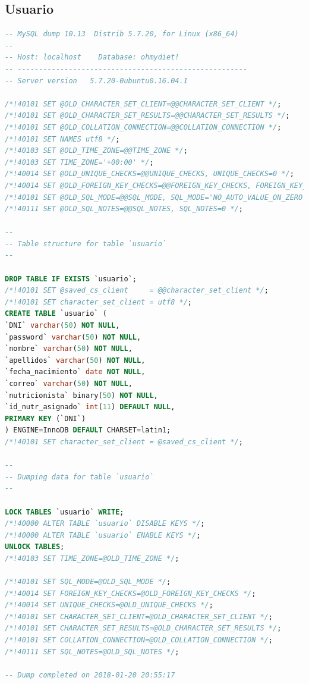 \documentclass[12pt,letterpaper]{article}
\begin{document}
\subsection{Usuario}
\begin{lstlisting}[language=sql]
-- MySQL dump 10.13  Distrib 5.7.20, for Linux (x86_64)
--
-- Host: localhost    Database: ohmydiet!
-- ------------------------------------------------------
-- Server version	5.7.20-0ubuntu0.16.04.1

/*!40101 SET @OLD_CHARACTER_SET_CLIENT=@@CHARACTER_SET_CLIENT */;
/*!40101 SET @OLD_CHARACTER_SET_RESULTS=@@CHARACTER_SET_RESULTS */;
/*!40101 SET @OLD_COLLATION_CONNECTION=@@COLLATION_CONNECTION */;
/*!40101 SET NAMES utf8 */;
/*!40103 SET @OLD_TIME_ZONE=@@TIME_ZONE */;
/*!40103 SET TIME_ZONE='+00:00' */;
/*!40014 SET @OLD_UNIQUE_CHECKS=@@UNIQUE_CHECKS, UNIQUE_CHECKS=0 */;
/*!40014 SET @OLD_FOREIGN_KEY_CHECKS=@@FOREIGN_KEY_CHECKS, FOREIGN_KEY_CHECKS=0 */;
/*!40101 SET @OLD_SQL_MODE=@@SQL_MODE, SQL_MODE='NO_AUTO_VALUE_ON_ZERO' */;
/*!40111 SET @OLD_SQL_NOTES=@@SQL_NOTES, SQL_NOTES=0 */;

--
-- Table structure for table `usuario`
--

DROP TABLE IF EXISTS `usuario`;
/*!40101 SET @saved_cs_client     = @@character_set_client */;
/*!40101 SET character_set_client = utf8 */;
CREATE TABLE `usuario` (
`DNI` varchar(50) NOT NULL,
`password` varchar(50) NOT NULL,
`nombre` varchar(50) NOT NULL,
`apellidos` varchar(50) NOT NULL,
`fecha_nacimiento` date NOT NULL,
`correo` varchar(50) NOT NULL,
`nutricionista` binary(50) NOT NULL,
`id_nutr_asignado` int(11) DEFAULT NULL,
PRIMARY KEY (`DNI`)
) ENGINE=InnoDB DEFAULT CHARSET=latin1;
/*!40101 SET character_set_client = @saved_cs_client */;

--
-- Dumping data for table `usuario`
--

LOCK TABLES `usuario` WRITE;
/*!40000 ALTER TABLE `usuario` DISABLE KEYS */;
/*!40000 ALTER TABLE `usuario` ENABLE KEYS */;
UNLOCK TABLES;
/*!40103 SET TIME_ZONE=@OLD_TIME_ZONE */;

/*!40101 SET SQL_MODE=@OLD_SQL_MODE */;
/*!40014 SET FOREIGN_KEY_CHECKS=@OLD_FOREIGN_KEY_CHECKS */;
/*!40014 SET UNIQUE_CHECKS=@OLD_UNIQUE_CHECKS */;
/*!40101 SET CHARACTER_SET_CLIENT=@OLD_CHARACTER_SET_CLIENT */;
/*!40101 SET CHARACTER_SET_RESULTS=@OLD_CHARACTER_SET_RESULTS */;
/*!40101 SET COLLATION_CONNECTION=@OLD_COLLATION_CONNECTION */;
/*!40111 SET SQL_NOTES=@OLD_SQL_NOTES */;

-- Dump completed on 2018-01-20 20:55:17

\end{lstlisting}
\end{document}
